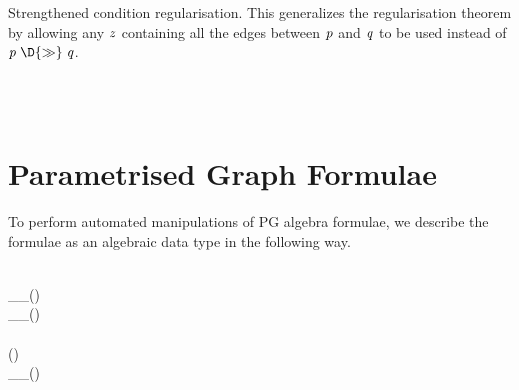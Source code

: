 Strengthened condition regularisation. This generalizes the regularisation theorem by allowing any \ensuremath{\Varid{z}} containing all the edges between \ensuremath{\Varid{p}} and \ensuremath{\Varid{q}} to be used instead of \ensuremath{\Varid{p}\;\D{\seq}\;\Varid{q}}.
\begin{hscode}\SaveRestoreHook
{}%
%
%
%
\>[3]{}\;\mathbin{:}\;\;\;\;\;\;\;{}\<[E]%
\\
\>[3]{}\<[31]%
\>[31]{}\;\;\D{\seq}\;\;\;\;\D{+}\;\;\D{+}\;\;{}\<[E]%
\\
\>[3]{}\<[31]%
\>[31]{}\;\D{[}\D{]}\;\;\D{\seq}\;\D{[}\D{]}\;\;\;\D{[}\D{]}\;\;\D{+}\;\D{[}\D{]}\;\;\D{+}\;\D{[}\;\;\D{]}\;\<[E]%
\ColumnHook
\end{hscode}\resethooks

\section{Parametrised Graph Formulae}

To perform automated manipulations of PG algebra formulae, we describe the formulae as an algebraic data type in the following way.



\begin{hscode}\SaveRestoreHook
{}%
%
%
\>[B]{}\;\;\mathbin{:}\;\;\<[E]%
\\
\>[B]{}\<[3]%
\>[3]{}\_\C{+}\_\;\mathbin{:}\;(\;\;\mathbin{:}\;)\;\;\<[E]%
\\
\>[B]{}\<[3]%
\>[3]{}\_\C{\seq}\_\;\mathbin{:}\;(\;\;\mathbin{:}\;)\;\;\<[E]%
\\
\>[B]{}\<[3]%
\>[3]{}\;\mathbin{:}\;\<[E]%
\\
\>[B]{}\<[3]%
\>[3]{}\;\mathbin{:}\;(\;\mathbin{:}\;)\;\;\<[E]%
\\
\>[B]{}\<[3]%
\>[3]{}\C{[}\_\C{]}\_\;\mathbin{:}\;(\;\mathbin{:}\;)\;\;\;\;\<[E]%
\ColumnHook
\end{hscode}\resethooks


